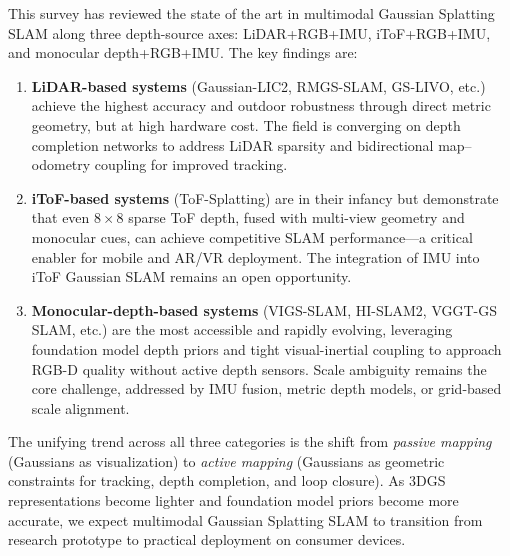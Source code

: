 This survey has reviewed the state of the art in multimodal Gaussian
Splatting SLAM along three depth-source axes: LiDAR+RGB+IMU,
iToF+RGB+IMU, and monocular depth+RGB+IMU.  The key findings are:

\begin{enumerate}
    \item \textbf{LiDAR-based systems} (Gaussian-LIC2, RMGS-SLAM, GS-LIVO,
    etc.) achieve the highest accuracy and outdoor robustness through
    direct metric geometry, but at high hardware cost.  The field is
    converging on depth completion networks to address LiDAR sparsity and
    bidirectional map--odometry coupling for improved tracking.

    \item \textbf{iToF-based systems} (ToF-Splatting) are in their infancy
    but demonstrate that even $8\times8$ sparse ToF depth, fused with
    multi-view geometry and monocular cues, can achieve competitive SLAM
    performance---a critical enabler for mobile and AR/VR deployment.
    The integration of IMU into iToF Gaussian SLAM remains an open
    opportunity.

    \item \textbf{Monocular-depth-based systems} (VIGS-SLAM, HI-SLAM2,
    VGGT-GS SLAM, etc.) are the most accessible and rapidly evolving,
    leveraging foundation model depth priors and tight visual-inertial
    coupling to approach RGB-D quality without active depth sensors.
    Scale ambiguity remains the core challenge, addressed by IMU fusion,
    metric depth models, or grid-based scale alignment.
\end{enumerate}

The unifying trend across all three categories is the shift from
\emph{passive mapping} (Gaussians as visualization) to \emph{active
mapping} (Gaussians as geometric constraints for tracking, depth
completion, and loop closure).  As 3DGS representations become lighter
and foundation model priors become more accurate, we expect multimodal
Gaussian Splatting SLAM to transition from research prototype to
practical deployment on consumer devices.
